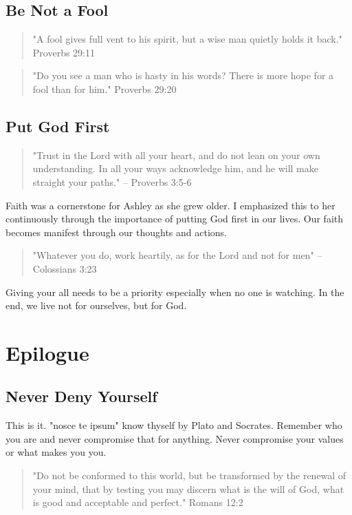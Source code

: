 \documentclass[11pt,a4paper,sans]{article}
\begin{document}
\subsection{Be Not a Fool}
\begin{quote}
    "A fool gives full vent to his spirit,
but a wise man quietly holds it back." Proverbs 29:11
\end{quote}

\begin{quote}
    "Do you see a man who is hasty in his words?
There is more hope for a fool than for him." Proverbs 29:20
\end{quote}

\subsection{Put God First}
\begin{quote}
    "Trust in the Lord with all your heart, and do not lean on 
your own understanding. In all your ways acknowledge him, and 
he will make straight your paths." -- Proverbs 3:5-6
\end{quote}

Faith was a cornerstone for Ashley as she grew older. I emphasized this
to her continuously through the importance of putting God first in our lives.
Our faith becomes manifest through our thoughts and actions.

\begin{quote}
    "Whatever you do, work heartily, as for the Lord and not for men" -- Colossians 3:23
\end{quote}

Giving your all needs to be a priority especially when no one is watching. In the 
end, we live not for ourselves, but for God.


\section{Epilogue}

\subsection{Never Deny Yourself}
This is it. "nosce te ipsum" know thyself by Plato and Socrates. Remember who you
are and never compromise that for anything. Never compromise your values or what makes
you you.


    \begin{quote}
        "Do not be conformed to this world, but be transformed by the renewal of your mind, that by testing you may discern what is the will of God, what is good and acceptable and perfect." Romans 12:2
    \end{quote}
\end{document}
